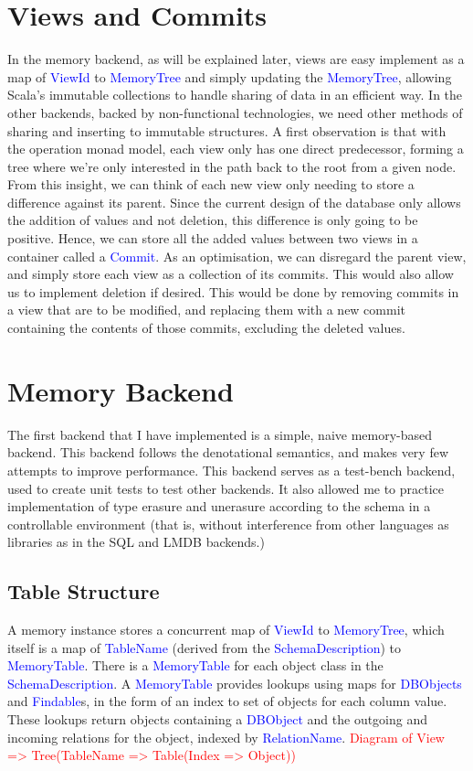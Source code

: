 \documentclass[12pt,a4paper,twoside,openright]{report}
\newcommand\todo[1]{\textcolor{red}{#1}}
\newcommand\codeName[1]{\textcolor{blue}{#1}}
\begin{document}
\section{Views and Commits}
In the memory backend, as will be explained later, views are easy implement as a map of \codeName{ViewId} to \codeName{MemoryTree} and simply updating the \codeName{MemoryTree}, allowing Scala’s immutable collections to handle sharing of data in an efficient way. In the other backends, backed by non-functional technologies, we need other methods of sharing and inserting to immutable structures. A first observation is that with the operation monad model, each view only has one direct predecessor, forming a tree where we’re only interested in the path back to the root from a given node. From this insight, we can think of each new view only needing to store a difference against its parent. Since the current design of the database only allows the addition of values and not deletion, this difference is only going to be positive. Hence, we can store all the added values between two views in a container called a \codeName{Commit}. As an optimisation, we can disregard the parent view, and simply store each view as a collection of its commits. This would also allow us to implement deletion if desired. This would be done by removing commits in a view that are to be modified, and replacing them with a new commit containing the contents of those commits, excluding the deleted values.

\section{Memory Backend}
The first backend that I have implemented is a simple, naive memory-based backend. This backend follows the denotational semantics, and makes very few attempts to improve performance. This backend serves as a test-bench backend, used to create unit tests to test other backends. It also allowed me to practice implementation of type erasure and unerasure according to the schema in a controllable environment (that is, without interference from other languages as libraries as in the SQL and LMDB backends.)
	\subsection{Table Structure}
	A memory instance stores a concurrent map of \codeName{ViewId} to \codeName{MemoryTree}, which itself is a map of \codeName{TableName} (derived from the \codeName{SchemaDescription}) to \codeName{MemoryTable}. There is a \codeName{MemoryTable} for each object class in the \codeName{SchemaDescription}. A \codeName{MemoryTable} provides lookups using maps for \codeName{DBObjects} and \codeName{Findable}s, in the form of an index to set of objects for each column value. These lookups return objects containing a \codeName{DBObject} and the outgoing and incoming relations for the object, indexed by \codeName{RelationName}. 
	\todo{Diagram of View => Tree(TableName => Table(Index => Object)) }
\end{document}
